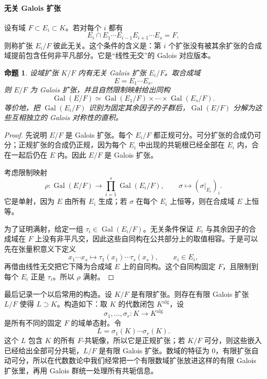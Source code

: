 \documentclass[11pt,a4paper,openany]{ctexbook}
\numberwithin{equation}{chapter}
\newcommand{\Gal}{\operatorname{Gal}}
\theoremstyle{plain}
\newtheorem{proposition}[theorem]{命题}
\theoremstyle{definition}
\theoremstyle{remark}
\begin{document}
\paragraph{无关 Galois 扩张}
设有域 $F\subset E_i\subset K$。若对每个 $i$ 都有
\[
E_i\cap E_1\cdots E_{i-1}E_{i+1}\cdots E_s=F,
\]
则称扩张 $E_i/F$ 彼此无关。这个条件的含义是：第 $i$ 个扩张没有被其余扩张的合成域提前包含任何非平凡部分。它是“线性无交”的 Galois 对应版本。

\begin{proposition}
设域扩张 $K/F$ 内有无关 Galois 扩张 $E_i/F$。取合成域
\[
E=E_1\cdots E_s.
\]
则 $E/F$ 为 Galois 扩张，并且自然限制映射给出同构
\[
\Gal(E/F)\simeq \Gal(E_1/F)\times\cdots\times\Gal(E_s/F).
\]
等价地，把 $\Gal(E_i/F)$ 识别为固定其余因子的子群后，$\Gal(E/F)$ 分解为这些互相独立的 Galois 对称性的直积。
\end{proposition}

\begin{proof}
先说明 $E/F$ 是 Galois 扩张。每个 $E_i/F$ 都正规可分。可分扩张的合成仍可分；正规扩张的合成仍正规，因为每个 $E_i$ 中出现的共轭根已经全部在 $E_i$ 内，合在一起后仍在 $E$ 内。因此 $E/F$ 是 Galois 扩张。

考虑限制映射
\[
\rho:\Gal(E/F)\longrightarrow \prod_{i=1}^s\Gal(E_i/F),\qquad
\sigma\longmapsto(\sigma|_{E_i})_i.
\]
它是单射，因为 $E$ 由所有 $E_i$ 生成；若 $\sigma$ 在每个 $E_i$ 上恒等，则在合成域 $E$ 上恒等。

为了证明满射，给定一组 $\tau_i\in\Gal(E_i/F)$。无关条件保证 $E_i$ 与其余因子的合成域在 $F$ 上没有非平凡交，因此这些自同构在公共部分上的取值相容。于是可以先在张量积意义下定义
\[
x_1\cdots x_s\longmapsto \tau_1(x_1)\cdots\tau_s(x_s),
\qquad x_i\in E_i,
\]
再借由线性无交把它下降为合成域 $E$ 上的自同构。这个自同构固定 $F$，且限制到每个 $E_i$ 正是 $\tau_i$。所以 $\rho$ 满射。
\end{proof}

最后记录一个以后常用的构造。设 $K/F$ 是有限扩张。则存在有限 Galois 扩张 $L/F$ 使得 $L\supset K$。构造如下：取 $K$ 的代数闭包 $K^{\mathrm{alg}}$，设
\[
\sigma_1,\dots,\sigma_r:K\longrightarrow K^{\mathrm{alg}}
\]
是所有不同的固定 $F$ 的域单态射。令
\[
L=\sigma_1(K)\cdots\sigma_r(K).
\]
这个 $L$ 包含 $K$ 的所有 $F$-共轭像，所以它是正规扩张；若 $K/F$ 可分，则这些嵌入已经给出全部可分共轭，$L/F$ 是有限 Galois 扩张。数域的特征为 $0$，有限扩张自动可分，所以在代数数论中我们经常把一个有限数域扩张放进这样的有限 Galois 扩张里，再用 Galois 群统一处理所有共轭信息。
\end{document}
